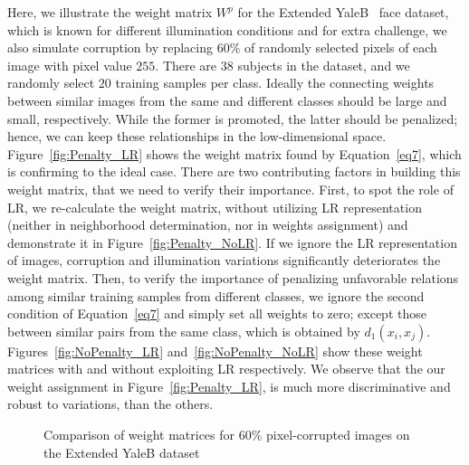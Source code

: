 \documentclass[journal]{IEEEtran}
\begin{document}
Here, we illustrate the weight matrix $W^p$ for the Extended YaleB~\cite{Yale} face dataset, which is known for different illumination conditions and for extra challenge, we also simulate corruption by replacing $60\%$ of randomly selected pixels of each image with pixel value $255$. There are $38$ subjects in the dataset, and we randomly select $20$ training samples per class. Ideally the connecting weights between similar images from the same and different classes should be large and small, respectively. While the former is promoted, the latter should be penalized; hence, we can keep these relationships in the low-dimensional space. Figure~\ref{fig:Penalty_LR} shows the weight matrix found by Equation~\eqref{eq7}, which is confirming to the ideal case. There are two contributing factors in building this weight matrix, that we need to verify their importance. First, 
to spot the role of LR, we re-calculate the weight matrix, without utilizing LR representation (neither in neighborhood determination, nor in weights assignment) and demonstrate it in Figure~\ref{fig:Penalty_NoLR}. If we ignore the LR representation of images, corruption and illumination variations significantly deteriorates the weight matrix. Then, to verify the importance of penalizing unfavorable relations among similar training samples from different classes, we ignore the second condition of Equation~\eqref{eq7} and simply set all weights to zero; except those between similar pairs from the same class, which is obtained by $d_1(x_i,x_j)$. Figures~\ref{fig:NoPenalty_LR} and~\ref{fig:NoPenalty_NoLR} show these weight matrices with and without exploiting LR respectively. We observe that the our weight assignment in Figure~\ref{fig:Penalty_LR}, is much more discriminative and robust to variations, than the others.
\begin{figure}[t]
\centering
{}
\hspace{4pt} 
\vspace{2pt} 
\hspace{4pt} 
\caption{Comparison of weight matrices for 60\% pixel-corrupted images on the Extended YaleB dataset}
\vspace{-1.5em}
\end{figure}
\end{document}
